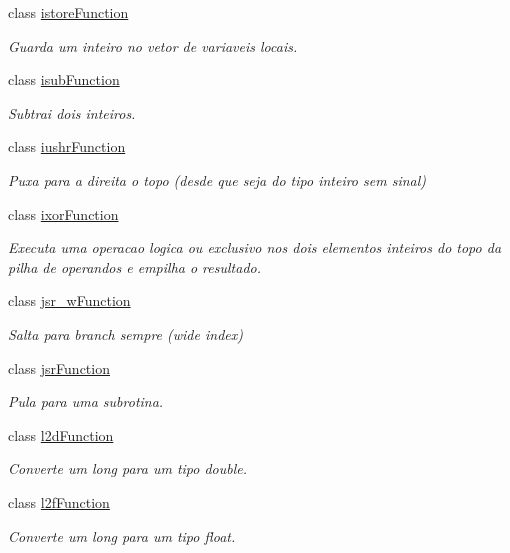\begin{DoxyCompactItemize}
class \hyperlink{classInstruction_1_1istoreFunction}{istore\+Function}
\begin{DoxyCompactList}\small\item\em Guarda um inteiro no vetor de variaveis locais. \end{DoxyCompactList}\item 
class \hyperlink{classInstruction_1_1isubFunction}{isub\+Function}
\begin{DoxyCompactList}\small\item\em Subtrai dois inteiros. \end{DoxyCompactList}\item 
class \hyperlink{classInstruction_1_1iushrFunction}{iushr\+Function}
\begin{DoxyCompactList}\small\item\em Puxa para a direita o topo (desde que seja do tipo inteiro sem sinal) \end{DoxyCompactList}\item 
class \hyperlink{classInstruction_1_1ixorFunction}{ixor\+Function}
\begin{DoxyCompactList}\small\item\em Executa uma operacao logica \textquotesingle{}ou exclusivo\textquotesingle{} nos dois elementos inteiros do topo da pilha de operandos e empilha o resultado. \end{DoxyCompactList}\item 
class \hyperlink{classInstruction_1_1jsr__wFunction}{jsr\+\_\+w\+Function}
\begin{DoxyCompactList}\small\item\em Salta para branch sempre (wide index) \end{DoxyCompactList}\item 
class \hyperlink{classInstruction_1_1jsrFunction}{jsr\+Function}
\begin{DoxyCompactList}\small\item\em Pula para uma subrotina. \end{DoxyCompactList}\item 
class \hyperlink{classInstruction_1_1l2dFunction}{l2d\+Function}
\begin{DoxyCompactList}\small\item\em Converte um long para um tipo double. \end{DoxyCompactList}\item 
class \hyperlink{classInstruction_1_1l2fFunction}{l2f\+Function}
\begin{DoxyCompactList}\small\item\em Converte um long para um tipo float. \end{DoxyCompactList}\item 

\end{DoxyCompactItemize}
